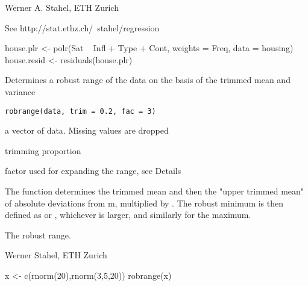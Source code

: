 \documentclass{article}
\begin{document}
\begin{Author}\relax
Werner A. Stahel, ETH Zurich
\end{Author}
\begin{References}\relax
See http://stat.ethz.ch/~stahel/regression
\end{References}
\begin{SeeAlso}\relax
{}
\end{SeeAlso}
\begin{Examples}
\begin{ExampleCode}
house.plr <- polr(Sat ~ Infl + Type + Cont, weights = Freq, data = housing)
house.resid <- residuals(house.plr)
\end{ExampleCode}
\end{Examples}

\begin{Description}\relax
Determines a robust range of the data on the basis of the trimmed mean
and variance
\end{Description}
\begin{Usage}
\begin{verbatim}
robrange(data, trim = 0.2, fac = 3)
\end{verbatim}
\end{Usage}
\begin{Arguments}
\begin{ldescription}
\item[\code{data}] a vector of data. Missing values are dropped 
\item[\code{trim}] trimming proportion 
\item[\code{fac}] factor used for expanding the range, see Details 
\end{ldescription}
\end{Arguments}
\begin{Details}\relax
The function determines the trimmed mean  and then the "upper
trimmed mean"  of absolute deviations from m, multiplied by
. The robust minimum is then defined as  or
, whichever is larger, and similarly for the maximum.
\end{Details}
\begin{Value}
The robust range.
\end{Value}
\begin{Author}\relax
Werner Stahel, ETH Zurich
\end{Author}
\begin{SeeAlso}\relax
{}
\end{SeeAlso}
\begin{Examples}
\begin{ExampleCode}
  x <- c(rnorm(20),rnorm(3,5,20))
  robrange(x)
\end{ExampleCode}
\end{Examples}
\end{document}
